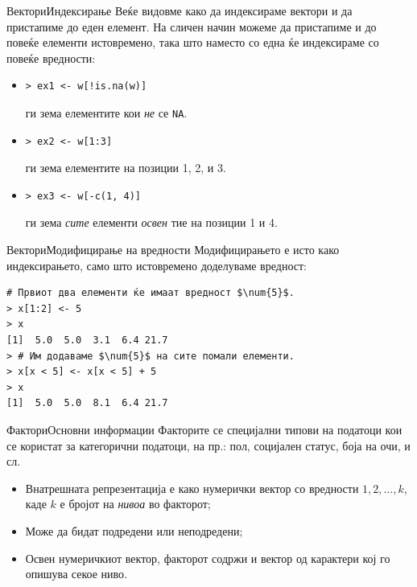 \documentclass[hyperref={unicode}, xcolor={svgnames, table},
usepdftitle=false]{beamer}
\theoremstyle{remark}
\begin{document}
\begin{frame}[fragile]{Вектори}{Индексирање}
  Веќе видовме како да индексираме вектори и да пристапиме до еден елемент.  На
  сличен начин можеме да пристапиме и до повеќе елементи истовремено, така што
  наместо со една ќе индексираме со повеќе вредности:
  \begin{itemize}
  \item
\begin{verbatim}
> ex1 <- w[!is.na(w)]
\end{verbatim}
    ги зема елементите кои \emph{не} се \texttt{NA}.
  \item
\begin{verbatim}
> ex2 <- w[1:3]
\end{verbatim}
    ги зема елементите на позиции \num{1}, \num{2}, и \num{3}.
\item
\begin{verbatim}
> ex3 <- w[-c(1, 4)]
\end{verbatim}
  ги зема \emph{сите} елементи \emph{освен} тие на позиции \num{1} и \num{4}.
\end{itemize}
\end{frame}

\begin{frame}[fragile]{Вектори}{Модифицирање на вредности}
  Модифицирањето е исто како индексирањето, само што истовремено доделуваме
  вредност:
\begin{verbatim}
# Првиот два елементи ќе имаат вредност $\num{5}$.
> x[1:2] <- 5
> x
[1]  5.0  5.0  3.1  6.4 21.7
> # Им додаваме $\num{5}$ на сите помали елементи.
> x[x < 5] <- x[x < 5] + 5
> x
[1]  5.0  5.0  8.1  6.4 21.7
\end{verbatim}
\end{frame}

\begin{frame}[fragile]{Фактори}{Основни информации}
  Факторите се специјални типови на податоци кои се користат за категорични
  податоци, на пр.: пол, социјален статус, боја на очи, и сл.
  \begin{itemize}
  \item Внатрешната репрезентација е како нумерички вектор со вредности
    \(1, 2, \ldots, k\), каде \(k\) е бројот на \emph{нивоа} во факторот;
  \item Може да бидат подредени или неподредени;
  \item Освен нумеричкиот вектор, факторот содржи и вектор од карактери кој го
    опишува секое ниво.
  \end{itemize}
\end{frame}
\end{document}
